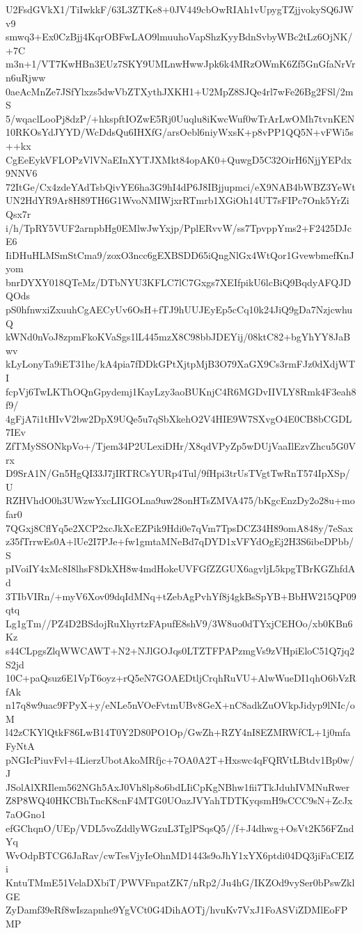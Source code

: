 U2FsdGVkX1/TiIwkkF/63L3ZTKe8+0JV449cbOwRIAh1vUpygTZjjvokySQ6JWv9
smwq3+Ex0CzBjj4KqrOBFwLAO9lmuuhoVapShzKyyBdnSvbyWBc2tLz6OjNK/+7C
m3n+1/VT7KwHBn3EUz7SKY9UMLnwHwwJpk6k4MRzOWmK6Zf5GnGfaNrVrn6uRjww
0aeAcMnZe7JSfYlxzs5dwVbZTXythJXKH1+U2MpZ8SJQe4rl7wFe26Bg2FSl/2mS
5/wqaclLooPj8dzP/+hkspftIOZwE5Rj0Uuqlu8iKwcWuf0wTrArLwOMh7tvnKEN
10RKOsYdJYYD/WcDdsQu6IHXfG/arsOebl6niyWxsK+p8vPP1QQ5N+vFWi5s++kx
CgEeEykVFLOPzVlVNaEInXYTJXMkt84opAK0+QuwgD5C32OirH6NjjYEPdx9NNV6
72ItGe/Cx4zdeYAdTsbQivYE6ha3G9hI4dP6J8IBjjupmci/eX9NAB4bWBZ3YeWt
UN2HdYR9Ar8H89TH6G1WvoNMIWjxrRTmrb1XGiOh14UT7sFIPc7Onk5YrZiQsx7r
i/h/TpRY5VUF2arnpbHg0EMlwJwYxjp/PplERvvW/ss7TpvppYms2+F2425DJcE6
IiDHuHLMSmStCma9/zoxO3ncc6gEXBSDD65iQngNlGx4WtQor1GvewbmefKnJyom
bnrDYXY018QTeMz/DTbNYU3KFLC7lC7Gxgs7XEIfpikU6lcBiQ9BqdyAFQJDQOds
pS0hfnwxiZxuuhCgAECyUv6OsH+fTJ9hUUJEyEp5cCq10k24JiQ9gDa7NzjcwhuQ
kWNd0nVoJ8zpmFkoKVaSgs1lL445mzX8C98bbJDEYij/08ktC82+bgYhYY8JaBwv
kLyLonyTa9iET31he/kA4pia7fDDkGPtXjtpMjB3O79XaGX9Cs3rmFJz0dXdjWTI
fcpVj6TwLKThOQnGpydemj1KayLzy3aoBUKnjC4R6MGDvIIVLY8Rmk4F3eah8f9/
4gFjA7i1tHIvV2bw2DpX9UQe5u7qSbXkehO2V4HIE9W7SXvgO4E0CB8bCGDL7IEv
ZfTMySSONkpVo+/Tjem34P2ULexiDHr/X8qdVPyZp5wDUjVaaIlEzvZhcu5G0Vrx
D9SrA1N/Gn5HgQI33J7jIRTRCsYURp4Tul/9fHpi3trUsTVgtTwRnT574IpXSp/U
RZHVhdO0h3UWzwYxcLIIGOLna9uw28onHTsZMVA475/bKgcEnzDy2o28u+mofar0
7QGxj8CflYq5e2XCP2xcJkXcEZPik9Hdi0e7qVm7TpsDCZ34H89omA848y/7eSax
z35fTrrwEs0A+lUe2I7PJe+fw1gmtaMNeBd7qDYD1xVFYdOgEj2H3S6ibeDPbb/S
pIVoiIY4xMc8I8lhsF8DkXH8w4mdHokeUVFGfZZGUX6agvljL5kpgTBrKGZhfdAd
3TIbVIRn/+myV6Xov09dqIdMNq+tZebAgPvhYf8j4gkBsSpYB+BbHW215QP09qtq
Lg1gTm//PZ4D2BSdojRuXhyrtzFApufE8shV9/3W8uo0dTYxjCEHOo/xb0KBn6Kz
s44CLpgsZlqWWCAWT+N2+NJlGOJqs0LTZTFPAPzmgVs9zVHpiEloC51Q7jq2S2jd
10C+paQsuz6E1VpT6oyz+rQ5eN7GOAEDtljCrqhRuVU+AlwWueDI1qhO6bVzRfAk
n17q8w9uac9FPyX+y/eNLe5nVOeFvtmUBv8GeX+nC8adkZuOVkpJidyp9lNIc/oM
l42zCKYlQtkF86LwB14T0Y2D80PO1Op/GwZh+RZY4nI8EZMRWfCL+1j0mfaFyNtA
pNGIcPiuvFvl+4LierzUbotAkoMRfjc+7OA0A2T+Hxswc4qFQRVtLBtdv1Bp0w/J
JSolAlXRIlem562NGh5AxJ0Vh8lp8o6bdLIiCpKgNBhw1fii7TkJduhIVMNuRwer
Z8P8WQ40HKCBhTncK8cnF4MTG0UOazJVYahTDTKyqsmH9sCCC9sN+ZcJx7aOGno1
efGChqnO/UEp/VDL5voZddlyWGzuL3TglPSqsQ5//f+J4dhwg+OsVt2K56FZndYq
WvOdpBTCG6JaRav/cwTesVjyIeOhnMD1443s9oJhY1xYX6ptdi04DQ3jiFaCEIZi
KntuTMmE51VelaDXbiT/PWVFnpatZK7/nRp2/Ju4hG/IKZOd9vySer0bPswZklGE
ZyDamf39eRf8wIszapnhe9YgVCt0G4DihAOTj/hvuKv7VxJ1FoASViZDMlEoFPMP
